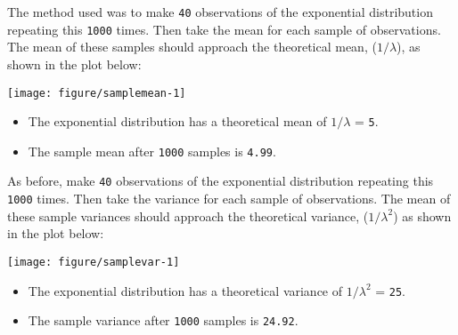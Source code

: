 \documentclass[legalpaper]{article}
\begin{document}

The method used was to make \texttt{40} observations of the exponential
distribution repeating this \texttt{1000} times. Then take the mean for
each sample of observations. The mean of these samples should approach
the theoretical mean, (\(1/\lambda\)), as shown in the plot below:

\begin{center}\texttt{[image: figure/samplemean-1]} \end{center}

\begin{itemize}
\itemsep1pt\parskip0pt
\item
  The exponential distribution has a theoretical mean of \(1/\lambda\) =
  \texttt{5}.
\item
  The sample mean after \texttt{1000} samples is \texttt{4.99}.
\end{itemize}


As before, make \texttt{40} observations of the exponential distribution
repeating this \texttt{1000} times. Then take the variance for each
sample of observations. The mean of these sample variances should
approach the theoretical variance, (\(1/\lambda^2\)) as shown in the
plot below:

\begin{center}\texttt{[image: figure/samplevar-1]} \end{center}

\begin{itemize}
\itemsep1pt\parskip0pt
\item
  The exponential distribution has a theoretical variance of
  \(1/\lambda^2\) = \texttt{25}.
\item
  The sample variance after \texttt{1000} samples is \texttt{24.92}.
\end{itemize}

\end{document}
